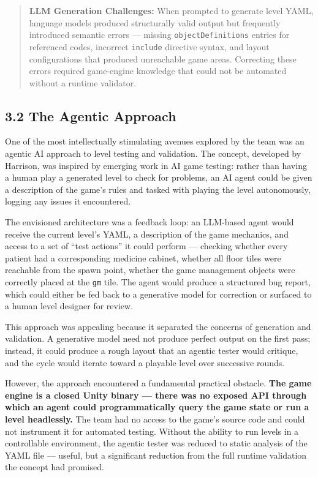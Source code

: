 \begin{quote}
\textbf{LLM Generation Challenges:} When prompted to generate level
YAML, language models produced structurally valid output but frequently
introduced semantic errors --- missing \texttt{objectDefinitions}
entries for referenced codes, incorrect \texttt{include} directive
syntax, and layout configurations that produced unreachable game areas.
Correcting these errors required game-engine knowledge that could not be
automated without a runtime validator.
\end{quote}

\subsection{3.2 The Agentic Approach}\label{the-agentic-approach}

One of the most intellectually stimulating avenues explored by the team
was an agentic AI approach to level testing and validation. The concept,
developed by Harrison, was inspired by emerging work in AI game testing:
rather than having a human play a generated level to check for problems,
an AI agent could be given a description of the game's rules and tasked
with playing the level autonomously, logging any issues it encountered.

The envisioned architecture was a feedback loop: an LLM-based agent
would receive the current level's YAML, a description of the game
mechanics, and access to a set of ``test actions'' it could perform ---
checking whether every patient had a corresponding medicine cabinet,
whether all floor tiles were reachable from the spawn point, whether the
game management objects were correctly placed at the \texttt{gm} tile.
The agent would produce a structured bug report, which could either be
fed back to a generative model for correction or surfaced to a human
level designer for review.

This approach was appealing because it separated the concerns of
generation and validation. A generative model need not produce perfect
output on the first pass; instead, it could produce a rough layout that
an agentic tester would critique, and the cycle would iterate toward a
playable level over successive rounds.

However, the approach encountered a fundamental practical obstacle.
\textbf{The game engine is a closed Unity binary --- there was no
exposed API through which an agent could programmatically query the game
state or run a level headlessly.} The team had no access to the game's
source code and could not instrument it for automated testing. Without
the ability to run levels in a controllable environment, the agentic
tester was reduced to static analysis of the YAML file --- useful, but a
significant reduction from the full runtime validation the concept had
promised.

